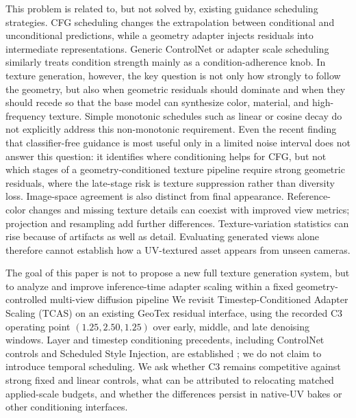 \documentclass[times,twocolumn,final]{elsarticle}
\providecommand{\DIFadd}[1]{{\protect\color{blue} \sf #1}} %
\providecommand{\DIFdel}[1]{{\protect\color{red} \scriptsize #1}} %
\providecommand{\DIFaddbegin}{} %
\providecommand{\DIFaddend}{} %
\providecommand{\DIFdelbegin}{} %
\providecommand{\DIFdelend}{} %
\begin{document}
\DIFdelbegin \DIFdel{This problem is related to, but not solved by, existing guidance scheduling strategies. CFG scheduling changes the extrapolation between conditional and unconditional predictions, while a geometry adapter injects residuals into intermediate representations. Generic ControlNet or adapter scale scheduling similarly treats condition strength mainly as a condition-adherence knob. In texture generation, however, the key question is not only how strongly to follow the geometry, but also when geometric residuals should dominate and when they should recede so that the base model can synthesize color, material, and high-frequency texture. Simple monotonic schedules such as linear or cosine decay do not explicitly address this non-monotonic requirement. Even the recent finding that classifier-free guidance is most useful only in a limited noise interval \cite{kynkanniemi2024limited} does not answer this question: it identifies where conditioning helps for CFG, but not which stages of a geometry-conditioned texture pipeline require strong geometric residuals, where the late-stage risk is texture suppression rather than diversity loss. }\DIFdelend \DIFaddbegin \DIFadd{Image-space agreement is also distinct from final appearance. Reference-color changes and missing texture details can coexist with improved view metrics; projection and resampling add further differences. Texture-variation statistics can rise because of artifacts as well as detail. Evaluating generated views alone therefore cannot establish how a UV-textured asset appears from unseen cameras.
}\DIFaddend

\DIFdelbegin \DIFdel{The goal of this paper is not to propose a new full texture generation system, but to analyze and improve inference-time adapter scaling within a fixed geometry-controlled multi-view diffusion pipeline}\DIFdelend \DIFaddbegin \DIFadd{We revisit Timestep-Conditioned Adapter Scaling (TCAS) on an existing GeoTex residual interface, using the recorded C3 operating point $(1.25,2.50,1.25)$ over early, middle, and late denoising windows. Layer and timestep conditioning precedents, including ControlNet controls and Scheduled Style Injection, are established \cite{controlnet2023layercontrol,diffusers2023controlnet,kulkarni2026ssi}; we do not claim to introduce temporal scheduling. We ask whether C3 remains competitive against strong fixed and linear controls, what can be attributed to relocating matched applied-scale budgets, and whether the differences persist in native-UV bakes or other conditioning interfaces}\DIFaddend .
\end{document}
